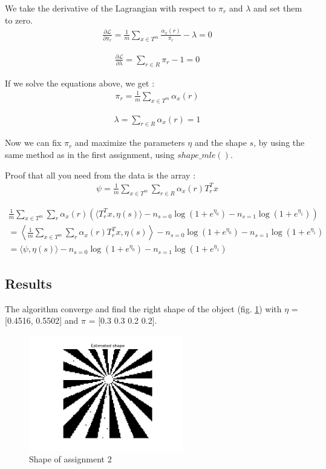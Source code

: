 \documentclass{article}
\newcommand{\Lagr}{\mathcal{L}}
\begin{document}
We take the derivative of the Lagrangian with respect to $\pi_r$ and $\lambda$ and set them to zero.
\begin{align*}
    \frac{\partial \Lagr}{\partial \pi_r} = \frac{1}{m} \sum_{x \in T^m} \frac{\alpha_x (r)}{\pi_r} - \lambda = 0
\end{align*}

\begin{align*}
    \frac{\partial \Lagr}{\partial \lambda} = \sum_{r \in R} \pi_r - 1 = 0
\end{align*}


If we solve the equations above, we get :
\begin{align*}
    \pi_r = \frac{1}{m} \sum_{x \in T^m} \alpha_x (r)
\end{align*}

\begin{align*}
    \lambda = \sum_{r \in R} \alpha_x (r) = 1
\end{align*}

Now we can fix $\pi_r$ and maximize the parameters $\eta$ and the shape $s$, by using the same method as in the first assignment, using $shape\_mle()$.

Proof that all you need from the data is the array : 
\begin{align*}
    \psi = \frac{1}{m} \sum_{x \in T^m} \sum_{r \in R} \alpha_x (r) T_r^T x
\end{align*}

\begin{align*}
    \frac{1}{m} \sum_{x \in T^m} \sum_{r} \alpha_x (r) (\langle T_r^T x, \eta(s) \rangle - n_{s=0} \log(1 + e^{\eta_0}) - n_{s=1} \log(1 + e^{\eta_1})) \\
    = \left\langle \frac{1}{m} \sum_{x \in T^m} \sum_{r}  \alpha_x (r) T_r^T x, \eta(s) \right\rangle - n_{s=0} \log(1 + e^{\eta_0}) - n_{s=1} \log(1 + e^{\eta_1}) \\
    = \langle \psi, \eta(s) \rangle - n_{s=0} \log(1 + e^{\eta_0}) - n_{s=1} \log(1 + e^{\eta_1})
\end{align*}

\newpage
\subsection*{Results}
The algorithm converge and find the right shape of the object (fig. \ref{fig:shape2}) with $\eta$ = [0.4516, 0.5502] and $\pi$ = [0.3 0.3 0.2 0.2].

\begin{figure}[h]
    \centering
    \includegraphics[width=0.6\textwidth]{images/shape2.png}
    \caption{Shape of assignment 2}
    \label{fig:shape2}
\end{figure}
\end{document}
